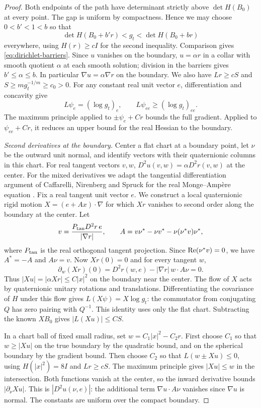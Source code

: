 \begin{proof}
Both endpoints of the path have determinant strictly above $\det H(B_0)$
at every point. The gap is uniform by compactness. Hence we may choose
$0<b'<1<b$ so that
\[
 \det H(B_0+b'r)<g_t<\det H(B_0+br)
\]
everywhere, using $H(r)\ge cI$ for the second inequality. Comparison
gives \eqref{eq:dirichlet-barriers}. Since $u$ vanishes on the boundary,
$u=\alpha r$ in a collar with smooth quotient $\alpha$ at each smooth
solution; division in the barriers gives $b'\le\alpha\le b$. In
particular $\nabla u=\alpha\nabla r$ on the boundary.
We also have $Lr\ge cS$ and $S\ge m g_t^{-1/m}\ge c_0>0$.
For any constant real unit vector $e$, differentiation and concavity give
\begin{equation}\label{eq:dirichlet-directional}
 L\psi_e=(\log g_t)_e,\qquad L\psi_{ee}\ge(\log g_t)_{ee}.
\end{equation}
The maximum principle applied to $\pm\psi_e+Cr$ bounds the full
gradient. Applied to $\psi_{ee}+Cr$, it reduces an upper bound for the
real Hessian to the boundary.

\emph{Second derivatives at the boundary.}
Center a flat chart at a boundary point, let $\nu$ be the outward unit
normal, and identify vectors with their quaternionic columns in this
chart. For real tangent vectors $v,w$,
$D^2u(v,w)=\alpha D^2r(v,w)$ at the center. For the mixed derivatives
we adapt the tangential differentiation argument of Caffarelli, Nirenberg
and Spruck for the real Monge--Ampère equation
\cite[Section~2, (2.11)--(2.14)]{CNS1984}. Fix a real tangent unit
vector $e$. We construct a local quaternionic rigid motion
$X=(e+Ax)\cdot\nabla$ for which $Xr$ vanishes to second order along
the boundary at the center. Let
\[
 v=\frac{P_{\rm tan}D^2r\,e}{|\nabla r|},\qquad
 A=v\nu^*-\nu v^*-\nu(\nu^*v)\nu^* ,
\]
where $P_{\rm tan}$ is the real orthogonal tangent projection. Since
$\operatorname{Re}(\nu^*v)=0$, we have $A^*=-A$ and $A\nu=v$. Now $Xr(0)=0$ and
for every tangent $w$,
\[
 \partial_w(Xr)(0)=D^2r(w,e)-|\nabla r|\,w\cdot A\nu=0.
\]
Thus $|Xu|=|\alpha Xr|\le C|x|^2$ on the boundary near the center.
The flow of $X$ acts by quaternionic unitary rotations and translations.
Differentiating the covariance of $H$ under this flow gives
$L(X\psi)=X\log g_t$: the commutator from conjugating $Q$ has zero
pairing with $Q^{-1}$. This identity uses only the flat chart.
Subtracting the known $XB_0$ gives $|L(Xu)|\le CS$.

In a chart ball of fixed small radius, set $w=C_1|x|^2-C_2r$.
First choose $C_1$ so that $w\ge|Xu|$ on the true boundary by the
quadratic bound, and on the spherical boundary by the gradient bound.
Then choose $C_2$ so that $L(w\pm Xu)\le0$, using $H(|x|^2)=8I$
and $Lr\ge cS$. The maximum principle gives $|Xu|\le w$ in the
intersection. Both functions vanish at the center, so the inward
derivative bounds $|\partial_\nu Xu|$. This is $|D^2u(\nu,e)|$:
the additional term $\nabla u\cdot A\nu$ vanishes since $\nabla u$
is normal. The constants are uniform over the compact boundary.


\end{proof}
